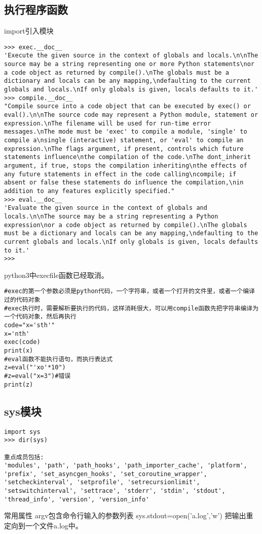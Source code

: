 \documentclass[twoside,11pt]{book}
\begin{document}
\subsection{执行程序函数}
import引入模块
\begin{lstlisting}
>>> exec.__doc__
'Execute the given source in the context of globals and locals.\n\nThe source may be a string representing one or more Python statements\nor a code object as returned by compile().\nThe globals must be a dictionary and locals can be any mapping,\ndefaulting to the current globals and locals.\nIf only globals is given, locals defaults to it.'
>>> compile.__doc__
"Compile source into a code object that can be executed by exec() or eval().\n\nThe source code may represent a Python module, statement or expression.\nThe filename will be used for run-time error messages.\nThe mode must be 'exec' to compile a module, 'single' to compile a\nsingle (interactive) statement, or 'eval' to compile an expression.\nThe flags argument, if present, controls which future statements influence\nthe compilation of the code.\nThe dont_inherit argument, if true, stops the compilation inheriting\nthe effects of any future statements in effect in the code calling\ncompile; if absent or false these statements do influence the compilation,\nin addition to any features explicitly specified."
>>> eval.__doc__
'Evaluate the given source in the context of globals and locals.\n\nThe source may be a string representing a Python expression\nor a code object as returned by compile().\nThe globals must be a dictionary and locals can be any mapping,\ndefaulting to the current globals and locals.\nIf only globals is given, locals defaults to it.'
>>>
\end{lstlisting}
python3中execfile函数已经取消。

\begin{lstlisting}
#exec的第一个参数必须是python代码，一个字符串，或者一个打开的文件里，或者一个编译过的代码对象
#exec执行时，需要解析要执行的代码，这样消耗很大，可以用compile函数先把字符串编译为一个代码对象，然后再执行
code="x='sth'"
x='nth'
exec(code)
print(x)
#eval函数不能执行语句，而执行表达式
z=eval("'xo'*10")
#z=eval("x=3")#错误
print(z)
\end{lstlisting}


\subsection{sys模块}
\begin{lstlisting}
import sys
>>> dir(sys)

重点成员包括:
'modules', 'path', 'path_hooks', 'path_importer_cache', 'platform', 'prefix', 'set_asyncgen_hooks', 'set_coroutine_wrapper', 'setcheckinterval', 'setprofile', 'setrecursionlimit', 'setswitchinterval', 'settrace', 'stderr', 'stdin', 'stdout', 'thread_info', 'version', 'version_info'
\end{lstlisting}
常用属性
argv包含命令行输入的参数列表
sys.stdout=open('a.log','w')
把输出重定向到一个文件a.log中。
\end{document}
